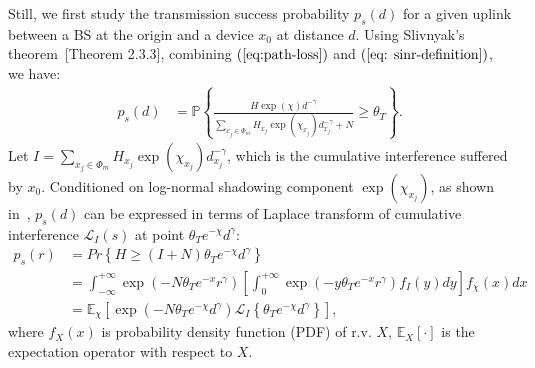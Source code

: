 Still, we first study the transmission success probability $p_s(d)$ for a given uplink between a BS at the origin and a device $x_0$ at distance $d$. Using Slivnyak's theorem~\cite{vaze2015random}[Theorem 2.3.3], combining $(\ref{eq:path-loss})$ and $(\ref{eq: sinr-definition})$, we have:
\begin{align}
p_{s} \left( d \right)
& =\mathbb{P}\left\lbrace \frac{H \exp(\chi) d^{-\gamma}}{\sum_{x_j \in \Phi_{m}} H_{x_j} \exp(\chi_{x_j}) d_{x_j}^{-\gamma} + N}  \geq \theta_T \right\rbrace. \nonumber
\end{align}
Let $I=\sum_{x_j \in \Phi_{m}} H_{x_j} \exp(\chi_{x_j}) d_{x_j}^{-\gamma}$, which is the cumulative interference suffered by $x_0$. Conditioned on log-normal shadowing component $\exp(\chi_{x_j}) $, as shown in~\cite{haenggi2009interference}, $p_{s}\left( d \right)$ can be expressed in terms of Laplace transform of cumulative interference $\mathcal{L}_{I}(s)$ at point $\theta_{T} e^{-\chi} d^{\gamma}$:
\begin{align}
\label{eq:def_ps_nearest_bs}
p_{s}\left( r \right)  &= Pr \left\lbrace H  \geq (I+N) \theta_{T} e^{-\chi}d ^{\gamma}  \right\rbrace \nonumber\\ 
&= \int_{-\infty}^{+\infty}   \exp(-N \theta_{T} e^{-x} r^{\gamma} ) \left[ \int_{0}^{+\infty} \exp(-y \theta_{T} e^{-x} r^{\gamma} ) f_{I}(y)dy\right] f_{\chi}(x) dx  \nonumber\\
&= \mathbb{E}_{\chi} \left[ \exp(-N \theta_{T} e^{-\chi} d^{\gamma} ) \mathcal{L}_{I}\left\lbrace \theta_{T} e^{-\chi} d^{\gamma}\right\rbrace \right],
\end{align}
where $f_{X} (x)$ is probability density function (PDF) of r.v. $X$, $\mathbb{E}_{X} \left[ \cdot \right] $ is the expectation operator with respect to $X$.

